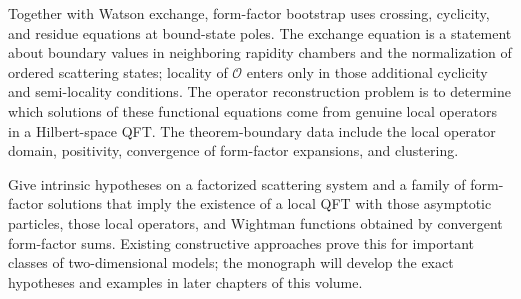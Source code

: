 Together with Watson exchange, form-factor bootstrap uses crossing,
cyclicity, and residue equations at bound-state poles.  The exchange equation
is a statement about boundary values in neighboring rapidity chambers and the
normalization of ordered scattering states; locality of \(\mathcal O\) enters
only in those additional cyclicity and semi-locality conditions.
The operator reconstruction problem is to determine which solutions of these
functional equations come from genuine local operators in a Hilbert-space
QFT.  The theorem-boundary data include the local operator domain,
positivity, convergence of form-factor expansions, and clustering.

\begin{openproblem}
  \label{op:form-factor-reconstruction-completeness}
Give intrinsic hypotheses on a factorized scattering system and a family of
form-factor solutions that imply the existence of a local QFT with those
asymptotic particles, those local operators, and Wightman functions obtained
by convergent form-factor sums.  Existing constructive approaches prove this
for important classes of two-dimensional models; the monograph will develop
the exact hypotheses and examples in later chapters of this volume.
\end{openproblem}
